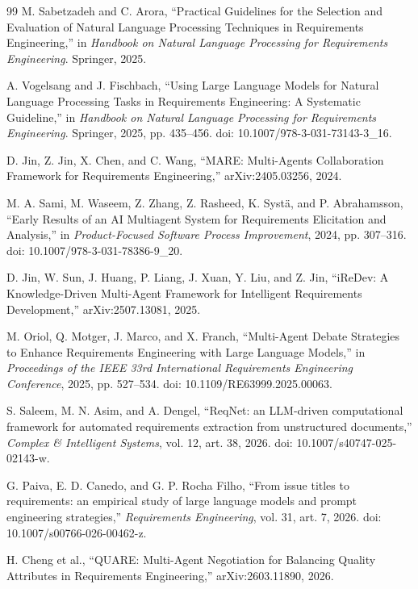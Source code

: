 \begin{thebibliography}{99}
M. Sabetzadeh and C. Arora,
“Practical Guidelines for the Selection and Evaluation of Natural Language Processing Techniques in Requirements Engineering,”
in \emph{Handbook on Natural Language Processing for Requirements Engineering}.
Springer, 2025.

A. Vogelsang and J. Fischbach,
“Using Large Language Models for Natural Language Processing Tasks in Requirements Engineering: A Systematic Guideline,”
in \emph{Handbook on Natural Language Processing for Requirements Engineering}.
Springer, 2025, pp. 435--456.
doi: 10.1007/978-3-031-73143-3\_16.

D. Jin, Z. Jin, X. Chen, and C. Wang,
“MARE: Multi-Agents Collaboration Framework for Requirements Engineering,”
arXiv:2405.03256, 2024.

M. A. Sami, M. Waseem, Z. Zhang, Z. Rasheed, K. Systä, and P. Abrahamsson,
“Early Results of an AI Multiagent System for Requirements Elicitation and Analysis,”
in \emph{Product-Focused Software Process Improvement},
2024, pp. 307--316.
doi: 10.1007/978-3-031-78386-9\_20.

D. Jin, W. Sun, J. Huang, P. Liang, J. Xuan, Y. Liu, and Z. Jin,
“iReDev: A Knowledge-Driven Multi-Agent Framework for Intelligent Requirements Development,”
arXiv:2507.13081, 2025.

M. Oriol, Q. Motger, J. Marco, and X. Franch,
“Multi-Agent Debate Strategies to Enhance Requirements Engineering with Large Language Models,”
in \emph{Proceedings of the IEEE 33rd International Requirements Engineering Conference},
2025, pp. 527--534.
doi: 10.1109/RE63999.2025.00063.

S. Saleem, M. N. Asim, and A. Dengel,
“ReqNet: an LLM-driven computational framework for automated requirements extraction from unstructured documents,”
\emph{Complex \& Intelligent Systems}, vol. 12, art. 38, 2026.
doi: 10.1007/s40747-025-02143-w.

G. Paiva, E. D. Canedo, and G. P. Rocha Filho,
“From issue titles to requirements: an empirical study of large language models and prompt engineering strategies,”
\emph{Requirements Engineering}, vol. 31, art. 7, 2026.
doi: 10.1007/s00766-026-00462-z.

H. Cheng et al.,
“QUARE: Multi-Agent Negotiation for Balancing Quality Attributes in Requirements Engineering,”
arXiv:2603.11890, 2026.


\end{thebibliography}
